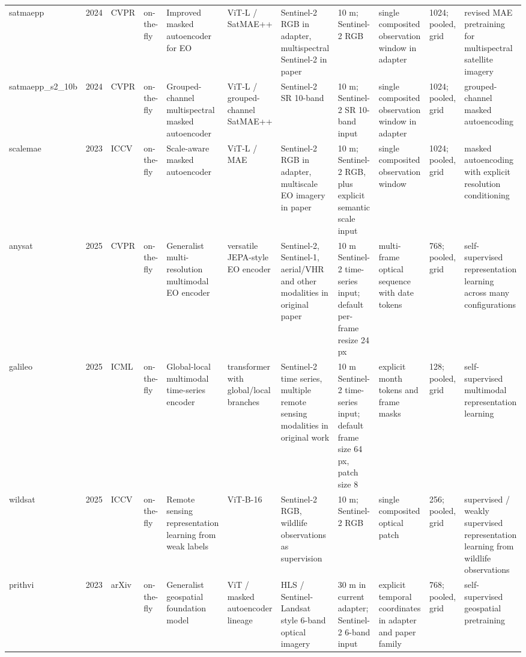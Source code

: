 \begin{landscape}
\begin{longtable}{p{1.45cm}p{0.75cm}p{1.2cm}p{0.95cm}p{2.25cm}p{2.05cm}p{2.75cm}p{2.35cm}p{2.25cm}p{1.55cm}p{3.0cm}}
satmaepp & 2024 & CVPR & on-the-fly & Improved masked autoencoder for EO & ViT-L / SatMAE++ & Sentinel-2 RGB in adapter, multispectral Sentinel-2 in paper & 10 m; Sentinel-2 RGB & single composited observation window in adapter & 1024; pooled, grid & revised MAE pretraining for multispectral satellite imagery \\
satmaepp\_s2\_10b & 2024 & CVPR & on-the-fly & Grouped-channel multispectral masked autoencoder & ViT-L / grouped-channel SatMAE++ & Sentinel-2 SR 10-band & 10 m; Sentinel-2 SR 10-band input & single composited observation window in adapter & 1024; pooled, grid & grouped-channel masked autoencoding \\
scalemae & 2023 & ICCV & on-the-fly & Scale-aware masked autoencoder & ViT-L / MAE & Sentinel-2 RGB in adapter, multiscale EO imagery in paper & 10 m; Sentinel-2 RGB, plus explicit semantic scale input & single composited observation window & 1024; pooled, grid & masked autoencoding with explicit resolution conditioning \\
anysat & 2025 & CVPR & on-the-fly & Generalist multi-resolution multimodal EO encoder & versatile JEPA-style EO encoder & Sentinel-2, Sentinel-1, aerial/VHR and other modalities in original paper & 10 m Sentinel-2 time-series input; default per-frame resize 24 px & multi-frame optical sequence with date tokens & 768; pooled, grid & self-supervised representation learning across many configurations \\
galileo & 2025 & ICML & on-the-fly & Global-local multimodal time-series encoder & transformer with global/local branches & Sentinel-2 time series, multiple remote sensing modalities in original work & 10 m Sentinel-2 time-series input; default frame size 64 px, patch size 8 & explicit month tokens and frame masks & 128; pooled, grid & self-supervised multimodal representation learning \\
wildsat & 2025 & ICCV & on-the-fly & Remote sensing representation learning from weak labels & ViT-B-16 & Sentinel-2 RGB, wildlife observations as supervision & 10 m; Sentinel-2 RGB & single composited optical patch & 256; pooled, grid & supervised / weakly supervised representation learning from wildlife observations \\
prithvi & 2023 & arXiv & on-the-fly & Generalist geospatial foundation model & ViT / masked autoencoder lineage & HLS / Sentinel-Landsat style 6-band optical imagery & 30 m in current adapter; Sentinel-2 6-band input & explicit temporal coordinates in adapter and paper family & 768; pooled, grid & self-supervised geospatial pretraining \\

\end{longtable}
\end{landscape}
